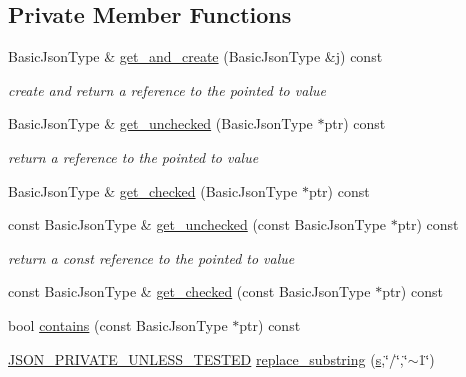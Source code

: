 \subsection*{Private Member Functions}
\begin{DoxyCompactItemize}
\item 
Basic\+Json\+Type \& \hyperlink{classnlohmann_1_1json__pointer_a7f6f4c2f21a183a6431bf1c5d23bb3c8}{get\+\_\+and\+\_\+create} (Basic\+Json\+Type \&j) const 
\begin{DoxyCompactList}\small\item\em create and return a reference to the pointed to value \end{DoxyCompactList}\item 
Basic\+Json\+Type \& \hyperlink{classnlohmann_1_1json__pointer_a585d16983947717ed470526aca6f561b}{get\+\_\+unchecked} (Basic\+Json\+Type $\ast$ptr) const 
\begin{DoxyCompactList}\small\item\em return a reference to the pointed to value \end{DoxyCompactList}\item 
Basic\+Json\+Type \& \hyperlink{classnlohmann_1_1json__pointer_a2ca435ff12d67e6f485960b66249244c}{get\+\_\+checked} (Basic\+Json\+Type $\ast$ptr) const 
\item 
const Basic\+Json\+Type \& \hyperlink{classnlohmann_1_1json__pointer_afba3cd5a640f9c727d2be5f7346b159e}{get\+\_\+unchecked} (const Basic\+Json\+Type $\ast$ptr) const 
\begin{DoxyCompactList}\small\item\em return a const reference to the pointed to value \end{DoxyCompactList}\item 
const Basic\+Json\+Type \& \hyperlink{classnlohmann_1_1json__pointer_a2fef6c493f8f54ecdf452cf49908d164}{get\+\_\+checked} (const Basic\+Json\+Type $\ast$ptr) const 
\item 
bool \hyperlink{classnlohmann_1_1json__pointer_aa3bbc65f80fbc991d35446f0bf46ddfb}{contains} (const Basic\+Json\+Type $\ast$ptr) const 
\item 
\hyperlink{json_8hpp_a2cf645f34610e7f7d6e09ab88a2ab917}{J\+S\+O\+N\+\_\+\+P\+R\+I\+V\+A\+T\+E\+\_\+\+U\+N\+L\+E\+S\+S\+\_\+\+T\+E\+S\+T\+ED} \hyperlink{classnlohmann_1_1json__pointer_a6bee1455acd41f3d5c51a4dbb51178ec}{replace\+\_\+substring} (\hyperlink{classnlohmann_1_1json__pointer_a40846302040a443256386bfa258ea061}{s},\char`\"{}/\char`\"{},\char`\"{}$\sim$1\char`\"{})
\end{DoxyCompactItemize}
